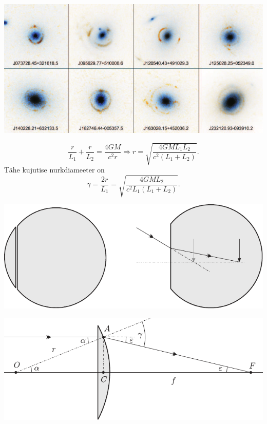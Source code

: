 \documentclass[10pt]{article}
\begin{document}
{\begin{center}
	\includegraphics[width=\textwidth]{2007-v2g-10-lah3}
\end{center}

\[
\frac{r}{L_{1}}+\frac{r}{L_{2}}=\frac{4 G M}{c^{2} r} \Rightarrow r=\sqrt{\frac{4 G M L_{1} L_{2}}{c^{2}\left(L_{1}+L_{2}\right)}}.
\]
Tähe kujutise nurkdiameeter on
\[
\gamma=\frac{2 r}{L_{1}}=\sqrt{\frac{4 G M L_{2}}{c^{2} L_{1}\left(L_{1}+L_{2}\right)}}.
\]
\probend
\bigskip


\solu
\begin{center}
	\includegraphics[width=\linewidth]{2005-lahg-10-lah1}
\end{center}

\begin{center}
	\includegraphics[width=\linewidth]{2005-lahg-10-lah2}
\end{center}

}
\end{document}
